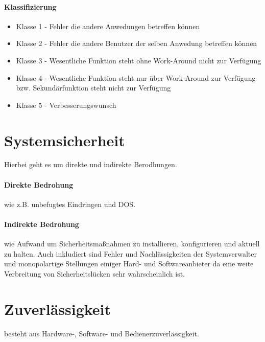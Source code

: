 
\paragraph{Klassifizierung}

\begin{itemize}
\item Klasse 1 - Fehler die andere Anwedungen betreffen können
\item Klasse 2 - Fehler die andere Benutzer der selben Anwedung betreffen können
\item Klasse 3 - Wesentliche Funktion steht ohne Work-Around nicht zur Verfügung
\item Klasse 4 - Wesentliche Funktion steht nur über Work-Around zur Verfügung bzw. Sekundärfunktion steht nicht zur Verfügung
\item Klasse 5 - Verbesserungswunsch
\end{itemize}

\section{Systemsicherheit} Hierbei geht es um direkte und indirekte Berodhungen.

\paragraph{Direkte Bedrohung} wie z.B. unbefugtes Eindringen und DOS.

\paragraph{Indirekte Bedrohung} wie Aufwand um Sicherheitsmaßnahmen zu installieren, konfigurieren und aktuell zu halten. Auch inkludiert sind Fehler und Nachlässigkeiten der Systemverwalter und monopolartige Stellungen einiger Hard- und Softwareanbieter da eine weite Verbreitung von Sicherheitslücken sehr wahrscheinlich ist.


\section{Zuverlässigkeit} besteht aus Hardware-, Software- und Bedienerzuverlässigkeit. 


